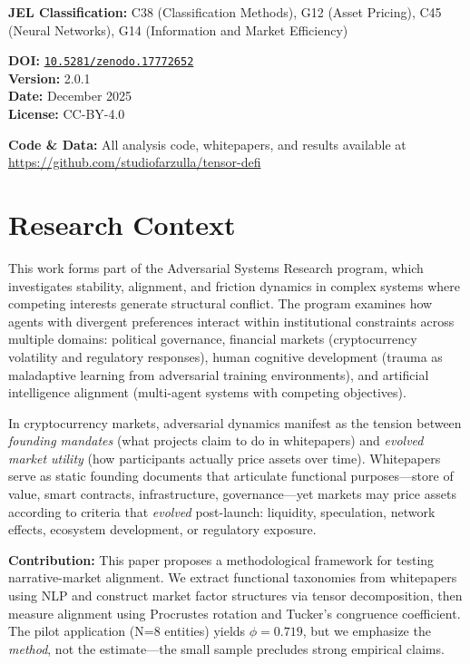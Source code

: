 \documentclass[11pt,twocolumn]{article}
\newcommand{\paperver}{2.0.1}
\newcommand{\paperdate}{December 2025}
\newcommand{\metadatabox}[1]{%
\begin{tcolorbox}[
    colback=gray!5,
    colframe=farzullaburgundy,
    title=Publication Metadata,
    fonttitle=\bfseries,
    coltitle=white,
    colbacktitle=farzullaburgundy,
    width=\columnwidth,
    arc=2mm,
    boxrule=0.8pt
]
\small
\textbf{DOI:} \href{https://doi.org/#1}{\texttt{#1}}\\
\textbf{Version:} \paperver\\
\textbf{Date:} \paperdate\\
\textbf{License:} CC-BY-4.0
\end{tcolorbox}
}
\begin{document}
\vspace{0.5em}
\noindent \textbf{JEL Classification:} C38 (Classification Methods), G12 (Asset Pricing), C45 (Neural Networks), G14 (Information and Market Efficiency)

\metadatabox{10.5281/zenodo.17772652}

\vspace{0.5em}
\noindent \textbf{Code \& Data:} All analysis code, whitepapers, and results available at \url{https://github.com/studiofarzulla/tensor-defi}

\section*{Research Context}

This work forms part of the Adversarial Systems Research program, which investigates stability, alignment, and friction dynamics in complex systems where competing interests generate structural conflict. The program examines how agents with divergent preferences interact within institutional constraints across multiple domains: political governance, financial markets (cryptocurrency volatility and regulatory responses), human cognitive development (trauma as maladaptive learning from adversarial training environments), and artificial intelligence alignment (multi-agent systems with competing objectives).

In cryptocurrency markets, adversarial dynamics manifest as the tension between \textit{founding mandates} (what projects claim to do in whitepapers) and \textit{evolved market utility} (how participants actually price assets over time). Whitepapers serve as static founding documents that articulate functional purposes---store of value, smart contracts, infrastructure, governance---yet markets may price assets according to criteria that \textit{evolved} post-launch: liquidity, speculation, network effects, ecosystem development, or regulatory exposure.

\textbf{Contribution:} This paper proposes a methodological framework for testing narrative-market alignment. We extract functional taxonomies from whitepapers using NLP and construct market factor structures via tensor decomposition, then measure alignment using Procrustes rotation and Tucker's congruence coefficient. The pilot application (N=8 entities) yields $\phi = 0.719$, but we emphasize the \textit{method}, not the estimate---the small sample precludes strong empirical claims.
\end{document}

